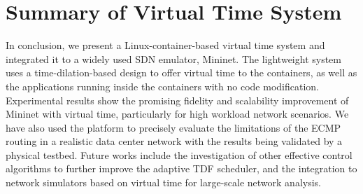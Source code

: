 \section{Summary of Virtual Time System}
\label{VT:Sec:Conclusion}
In conclusion, we present a Linux-container-based virtual time system and integrated it to a widely used SDN emulator, Mininet.
The lightweight system uses a time-dilation-based design to offer virtual time to the containers,
as well as the applications running inside the containers with no code modification.
Experimental results show the promising fidelity and scalability improvement of Mininet with virtual time,
particularly for high workload network scenarios. We have also used the platform to precisely
evaluate the limitations of the ECMP routing in a realistic data center network with the results being validated by a physical testbed.
Future works include the investigation of other effective control algorithms to further improve the adaptive TDF scheduler,
and the integration to network simulators based on virtual time for large-scale network analysis.
